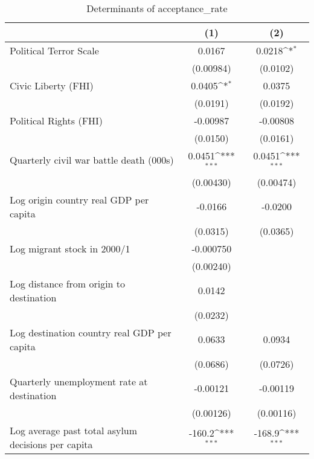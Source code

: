 \begin{table}[htbp]\centering
\def\sym#1{\ifmmode^{#1}\else\(^{#1}\)\fi}
\caption{Determinants of acceptance\_rate}
\begin{tabular}{l*{2}{c}}
\hline\hline
                    &\multicolumn{1}{c}{(1)}         &\multicolumn{1}{c}{(2)}         \\
\hline
Political Terror Scale&      0.0167         &      0.0218\sym{*}  \\
                    &   (0.00984)         &    (0.0102)         \\
[1em]
Civic Liberty (FHI) &      0.0405\sym{*}  &      0.0375         \\
                    &    (0.0191)         &    (0.0192)         \\
[1em]
Political Rights (FHI)&    -0.00987         &    -0.00808         \\
                    &    (0.0150)         &    (0.0161)         \\
[1em]
Quarterly civil war battle death (000s)&      0.0451\sym{***}&      0.0451\sym{***}\\
                    &   (0.00430)         &   (0.00474)         \\
[1em]
Log origin country real GDP per capita&     -0.0166         &     -0.0200         \\
                    &    (0.0315)         &    (0.0365)         \\
[1em]
Log migrant stock in 2000/1&   -0.000750         &                     \\
                    &   (0.00240)         &                     \\
[1em]
Log distance from origin to destination&      0.0142         &                     \\
                    &    (0.0232)         &                     \\
[1em]
Log destination country real GDP per capita&      0.0633         &      0.0934         \\
                    &    (0.0686)         &    (0.0726)         \\
[1em]
Quarterly unemployment rate at destination&    -0.00121         &    -0.00119         \\
                    &   (0.00126)         &   (0.00116)         \\
[1em]
Log average past total asylum decisions per capita&      -160.2\sym{***}&      -168.9\sym{***}\\

\end{tabular}
\end{table}
